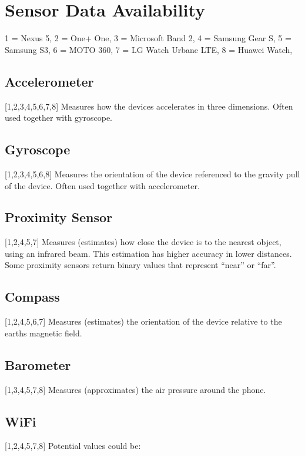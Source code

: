 
\section{Sensor Data Availability}
\label{sec:sensor_data_availability}

1 = Nexus 5,
2 = One+ One,
3 = Microsoft Band 2,
4 = Samsung Gear S,
5 = Samsung S3,
6 = MOTO 360,
7 = LG Watch Urbane LTE,
8 = Huawei Watch,


\subsection{Accelerometer}
\label{sub:accelerometer}
[1,2,3,4,5,6,7,8]
Measures how the devices accelerates in three dimensions. Often used together with gyroscope.

\subsection{Gyroscope}
\label{sub:gyroscope}
[1,2,3,4,5,6,8]
Measures the orientation of the device referenced to the gravity pull of the device. Often used together with accelerometer.

\subsection{Proximity Sensor}
\label{sub:proximity_sensor}
[1,2,4,5,7]
Measures (estimates) how close the device is to the nearest object, using an infrared beam. This estimation has higher accuracy in lower distances. Some proximity sensors return binary values that represent ``near'' or ``far''.

\subsection{Compass}
\label{sub:compass}
[1,2,4,5,6,7]
Measures (estimates) the orientation of the device relative to the earths magnetic field.

\subsection{Barometer}
\label{sub:barometer}
[1,3,4,5,7,8]
Measures (approximates) the air pressure around the phone.

\subsection{WiFi}
\label{sub:wifi}
[1,2,4,5,7,8]
Potential values could be: 

